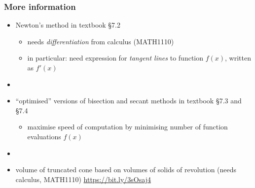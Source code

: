 \documentclass[english,14pt]{beamer}
\newcommand\red[1]{{\color{red} #1}}
\begin{document}

\begin{frame}[fragile]

\frametitle{More information}
\begin{itemize}
	\item Newton's method in textbook \red{\S7.2}
	\begin{itemize}
		\item needs \emph{differentiation} from calculus (MATH1110)
		\item in particular: need expression for \emph{tangent lines} to function $f(x)$, written as $f'(x)$
	\end{itemize}

	\item[]
	
	\item ``optimised'' versions of bisection and secant methods in textbook \red{\S7.3} and \red{\S7.4}
	\begin{itemize}
		\item maximise speed of computation by minimising number of function evaluations $f(x)$
	\end{itemize}
	
	\item[]
	
	\item volume of truncated cone based on volumes of solids of revolution (needs calculus, MATH1110) \href{https://bit.ly/3sOsaj4}{https://bit.ly/3sOsaj4}
\end{itemize}

\end{frame}
\end{document}
